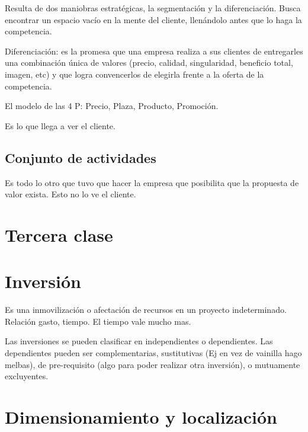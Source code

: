 \documentclass[titlepage,a4paper]{article}
\begin{document}
Resulta de dos maniobras estratégicas, la segmentación y la diferenciación. Busca encontrar un espacio vacío en la mente del cliente, llenándolo antes que lo haga la competencia.

Diferenciación: es la promesa que una empresa realiza a sus clientes de entregarles una combinación única de valores (precio, calidad, singularidad, beneficio total, imagen, etc) y que logra convencerlos de elegirla frente a la oferta de la competencia.

El modelo de las 4 P: Precio, Plaza, Producto, Promoción.

Es lo que llega a ver el cliente.

\subsection{Conjunto de actividades}
Es todo lo otro que tuvo que hacer la empresa que posibilita que la propuesta de valor exista. Esto no lo ve el cliente.





\section*{Tercera clase}

\section{Inversión}
Es una inmovilización o afectación de recursos en un proyecto indeterminado. Relación gasto, tiempo. El tiempo vale mucho mas.

Las inversiones se pueden clasificar en independientes o dependientes. Las dependientes pueden ser complementarias, sustitutivas (Ej en vez de vainilla hago melbas), de pre-requisito (algo para poder realizar otra inversión), o mutuamente excluyentes.

\section{Dimensionamiento y localización}
\end{document}
